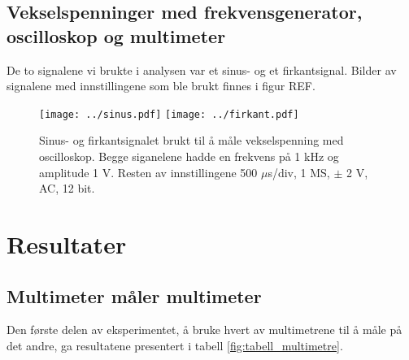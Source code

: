 \documentclass[reprint, english,notitlepage]{revtex4-1}  %
\begin{document}
\subsection{Vekselspenninger med frekvensgenerator, oscilloskop og multimeter}
De to signalene vi brukte i analysen var et sinus- og et firkantsignal. Bilder av signalene med innstillingene som ble brukt finnes i figur REF.

\begin{figure}
  \texttt{[image: ../sinus.pdf]}
  \texttt{[image: ../firkant.pdf]}
  \caption{Sinus- og firkantsignalet brukt til å måle vekselspenning med oscilloskop. Begge siganelene hadde en frekvens på 1 kHz og amplitude 1 V. Resten av innstillingene 500 $\mu$s/div, 1 MS, $\pm$ 2 V, AC, 12 bit.}
  \label{fig:sinussignal}
\end{figure}


\section{Resultater}

\subsection{Multimeter måler multimeter}
Den første delen av eksperimentet, å bruke hvert av multimetrene til å måle på det andre, ga resultatene presentert i tabell \ref{fig:tabell_multimetre}.
\end{document}
